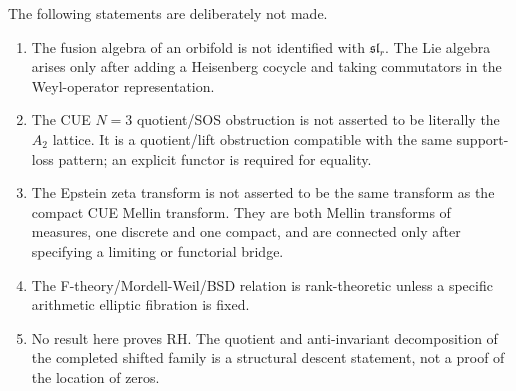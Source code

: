 \documentclass[11pt]{amsart}
\begin{document}
The following statements are deliberately not made.

\begin{enumerate}[label=(\roman*)]
\item The fusion algebra of an orbifold is not identified with $\mathfrak{sl}_r$.  The Lie algebra arises only after adding a Heisenberg cocycle and taking commutators in the Weyl-operator representation.
\item The CUE $N=3$ quotient/SOS obstruction is not asserted to be literally the $A_2$ lattice.  It is a quotient/lift obstruction compatible with the same support-loss pattern; an explicit functor is required for equality.
\item The Epstein zeta transform is not asserted to be the same transform as the compact CUE Mellin transform.  They are both Mellin transforms of measures, one discrete and one compact, and are connected only after specifying a limiting or functorial bridge.
\item The F-theory/Mordell-Weil/BSD relation is rank-theoretic unless a specific arithmetic elliptic fibration is fixed.
\item No result here proves RH.  The quotient and anti-invariant decomposition of the completed shifted family is a structural descent statement, not a proof of the location of zeros.
\end{enumerate}
\end{document}
